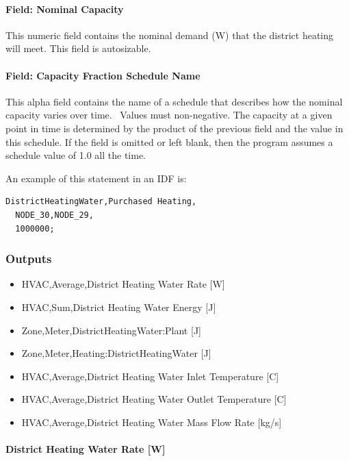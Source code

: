 \paragraph{Field: Nominal Capacity}\label{field-nominal-capacity-11}

This numeric field contains the nominal demand (W) that the district heating will meet. This field is autosizable.

\paragraph{Field: Capacity Fraction Schedule Name}\label{field-capacity-fraction-schedule-name-1}

This alpha field contains the name of a schedule that describes how the nominal capacity varies over time.~ Values must non-negative. The capacity at a given point in time is determined by the product of the previous field and the value in this schedule. If the field is omitted or left blank, then the program assumes a schedule value of 1.0 all the time.

An example of this statement in an IDF is:

\begin{lstlisting}
DistrictHeatingWater,Purchased Heating,
  NODE_30,NODE_29,
  1000000;
\end{lstlisting}

\subsubsection{Outputs}\label{outputs-15-002}

\begin{itemize}
    \item
    HVAC,Average,District Heating Water Rate {[}W{]}
    \item
    HVAC,Sum,District Heating Water Energy {[}J{]}
    \item
    Zone,Meter,DistrictHeatingWater:Plant {[}J{]}
    \item
    Zone,Meter,Heating:DistrictHeatingWater {[}J{]}
    \item
    HVAC,Average,District Heating Water Inlet Temperature {[}C{]}
    \item
    HVAC,Average,District Heating Water Outlet Temperature {[}C{]}
    \item
    HVAC,Average,District Heating Water Mass Flow Rate {[}kg/s{]}
\end{itemize}

\paragraph{District Heating Water Rate {[}W{]}}\label{district-heating-hot-water-rate-w}

